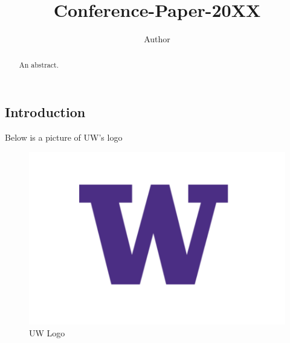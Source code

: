 \documentclass[10pt, a4paper]{article}
\begin{document}
\title{Conference-Paper-20XX}
\author{Author}
\maketitle

\begin{abstract}
An abstract.
\end{abstract}

\subsection*{Introduction}
Below is a picture of UW's logo
\begin{figure}
\centering
\includegraphics[width = .4\textwidth]{figures/fig1.png}
\caption{UW Logo}
\end{figure}
\end{document}
